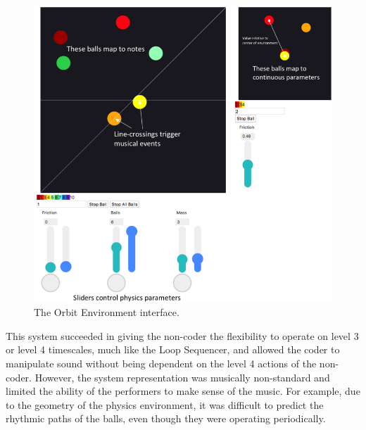 \documentclass{nime-alternate}
\begin{document}
\begin{figure}[htbp]
	\centering
		\includegraphics[width=1\columnwidth]{OrbitEnvironment2}
	\caption{The Orbit Environment interface.}
	\label{fig:OrbitEnvironment2}
\end{figure}

This system succeeded in giving the non-coder the flexibility to operate on level 3 or level 4 timescales, much like the Loop Sequencer, and allowed the coder to manipulate sound without being dependent on the level 4 actions of the non-coder. However, the system representation was musically non-standard and limited the ability of the performers to make sense of the music. For example, due to the geometry of the physics environment, it was difficult to predict the rhythmic paths of the balls, even though they were operating periodically. 
\end{document}
